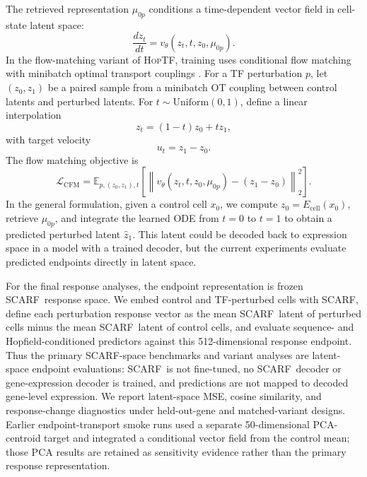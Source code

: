 \documentclass[11pt]{article}
\newcommand{\hoptf}{\textsc{HopTF}}
\newcommand{\scarf}{\textsc{SCARF}}
\begin{document}
The retrieved representation \(\mu_{0p}\) conditions a time-dependent vector field in cell-state latent space:
\begin{equation}
    \frac{d z_t}{dt} = v_\theta(z_t, t, z_0, \mu_{0p}).
\end{equation}
In the flow-matching variant of \hoptf, training uses conditional flow matching with minibatch optimal transport couplings \citep{tong2024cfm,tong2024sf2m}. For a TF perturbation \(p\), let \((z_0,z_1)\) be a paired sample from a minibatch OT coupling between control latents and perturbed latents. For \(t \sim \mathrm{Uniform}(0,1)\), define a linear interpolation
\begin{equation}
    z_t = (1-t)z_0 + t z_1,
\end{equation}
with target velocity
\begin{equation}
    u_t = z_1 - z_0.
\end{equation}
The flow matching objective is
\begin{equation}
    \mathcal{L}_{\mathrm{CFM}} = \mathbb{E}_{p,(z_0,z_1),t}\left[\left\|v_\theta(z_t,t,z_0,\mu_{0p}) - (z_1-z_0)\right\|_2^2\right].
\end{equation}
In the general formulation, given a control cell \(x_0\), we compute \(z_0=E_{\mathrm{cell}}(x_0)\), retrieve \(\mu_{0p}\), and integrate the learned ODE from \(t=0\) to \(t=1\) to obtain a predicted perturbed latent \(\hat{z}_1\). This latent could be decoded back to expression space in a model with a trained decoder, but the current experiments evaluate predicted endpoints directly in latent space.

For the final response analyses, the endpoint representation is frozen \scarf\ response space. We embed control and TF-perturbed cells with \scarf, define each perturbation response vector as the mean \scarf\ latent of perturbed cells minus the mean \scarf\ latent of control cells, and evaluate sequence- and Hopfield-conditioned predictors against this 512-dimensional response endpoint. Thus the primary \scarf-space benchmarks and variant analyses are latent-space endpoint evaluations: \scarf\ is not fine-tuned, no \scarf\ decoder or gene-expression decoder is trained, and predictions are not mapped to decoded gene-level expression. We report latent-space MSE, cosine similarity, and response-change diagnostics under held-out-gene and matched-variant designs. Earlier endpoint-transport smoke runs used a separate 50-dimensional PCA-centroid target and integrated a conditional vector field from the control mean; those PCA results are retained as sensitivity evidence rather than the primary response representation.
\end{document}
